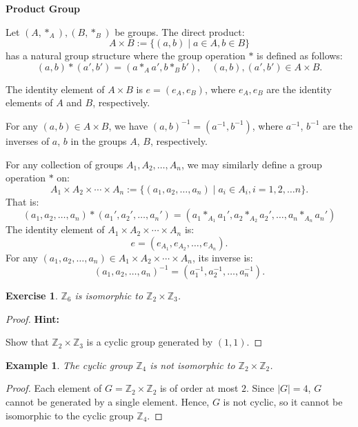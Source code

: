\documentclass[a4paper,12pt]{report}
\newcommand{\abs}[1]{\left|#1\right|}
\newcounter{statement}
\numberwithin{statement}{chapter}
\newtheorem{eg}[statement]{\bf Example}
\newtheorem{ex}[statement]{\bf Exercise}
\numberwithin{equation}{chapter}
\numberwithin{section}{chapter}
\numberwithin{subsection}{section}
\begin{document}
 {\bf Product Group} 



Let $(A, \ast_A), (B, \ast_B)$ be groups.  The direct product:
\[
A \times B := \{(a, b)\;|\; a\in A, b \in B\}
\]
has a natural group structure 
where the group operation $\ast$ is defined as follows:
\[
(a, b)\ast(a', b') = (a\ast_A a', b\ast_B b'), \quad (a, b), (a', b') \in A\times B. 
\]

The identity element of $A \times B$ is $e = (e_A, e_B)$, where $e_A, e_B$ 
are the identity elements of $A$ and $B$, respectively.




For any $(a, b) \in A \times B$, we have $(a, b)^{-1} = (a^{-1}, b^{-1})$,
where $a^{-1}$, $b^{-1}$ are the inverses of $a$, $b$ in the groups $A$, $B$, 
respectively.




For any collection of groups $A_1, A_2, \ldots, A_n$,
we may similarly define a group operation $\ast$ on:
\[
A_1 \times A_2 \times \cdots \times A_n
:= \{(a_1, a_2, \ldots, a_n)\;|\;a_i \in A_i, i = 1, 2, \ldots n\}.
\]
That is:
\[
(a_1, a_2, \ldots, a_n)\ast (a_1', a_2', \ldots, a_n')
=
(a_1\ast_{A_1} a_1', a_2\ast_{A_2} a_2', \ldots, a_n \ast_{A_n} a_n')
\]
The identity element of $A_1 \times A_2 \times \cdots \times A_n$ is:
\[
e = (e_{A_1}, e_{A_2}, \ldots, e_{A_n}).
\]
For any $(a_1, a_2, \ldots, a_n) \in A_1 \times A_2 \times \cdots \times A_n$, 
its inverse is:
\[
(a_1, a_2, \ldots, a_n)^{-1} = (a_1^{-1}, a_2^{-1}, \ldots, a_n^{-1}).
\]


\begin{ex}
$\mathbb{Z}_6$ is isomorphic to $\mathbb{Z}_2\times\mathbb{Z}_3$.
\end{ex}
\begin{proof}

 {\bf Hint:} 



Show that $\mathbb{Z}_2\times\mathbb{Z}_3$ is a cyclic group generated by $(1, 1)$.
\end{proof}
\begin{eg}

The cyclic group $\mathbb{Z}_4$ is not isomorphic to $\mathbb{Z}_2 \times \mathbb{Z}_2$.
\end{eg}
\begin{proof}

Each element of $G = \mathbb{Z}_2\times\mathbb{Z}_2$ is of order at most $2$.
Since $\abs{G} = 4$, $G$ cannot be generated by a single element.  
Hence, $G$ is not cyclic,
so it cannot be isomorphic to the cyclic group $\mathbb{Z}_4$.


\end{proof}
\end{document}
